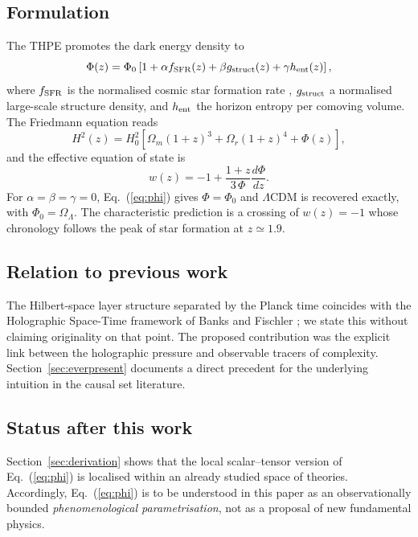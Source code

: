 \documentclass[aps,prd,twocolumn,superscriptaddress,nofootinbib,floatfix]{revtex4-2}
\newcommand{\LCDM}{\ensuremath{\Lambda}CDM}
\begin{document}
\subsection{Formulation}

The THPE promotes the dark energy density to
%
\begin{equation}
\Phi(z)=\Phi_0\left[1+\alpha f_{\rm SFR}(z)+\beta g_{\rm struct}(z)
+\gamma h_{\rm ent}(z)\right],
\label{eq:phi}
\end{equation}
%
where $f_{\rm SFR}$ is the normalised cosmic star formation rate
\cite{Madau2014}, $g_{\rm struct}$ a normalised large-scale structure
density, and $h_{\rm ent}$ the horizon entropy per comoving volume.
The Friedmann equation reads
%
\begin{equation}
H^2(z)=H_0^2\left[\Omega_m(1+z)^3+\Omega_r(1+z)^4+\Phi(z)\right],
\label{eq:friedmann}
\end{equation}
%
and the effective equation of state is
%
\begin{equation}
w(z)=-1+\frac{1+z}{3\,\Phi}\frac{d\Phi}{dz}.
\label{eq:woz}
\end{equation}
%
For $\alpha=\beta=\gamma=0$, Eq.~(\ref{eq:phi}) gives $\Phi=\Phi_0$ and
\LCDM{} is recovered exactly, with $\Phi_0=\Omega_\Lambda$. The
characteristic prediction is a crossing of $w(z)=-1$ whose chronology
follows the peak of star formation at $z\simeq1.9$.

\subsection{Relation to previous work}

The Hilbert-space layer structure separated by the Planck time
coincides with the Holographic Space-Time framework of Banks and
Fischler \cite{Banks2011}; we state this without claiming originality on
that point. The proposed contribution was the explicit link between the
holographic pressure and observable tracers of complexity.
Section~\ref{sec:everpresent} documents a direct precedent for the
underlying intuition in the causal set literature.

\subsection{Status after this work}

Section~\ref{sec:derivation} shows that the local scalar--tensor version
of Eq.~(\ref{eq:phi}) is localised within an already studied space of
theories. Accordingly, Eq.~(\ref{eq:phi}) is to be understood in this
paper as an observationally bounded \emph{phenomenological
parametrisation}, not as a proposal of new fundamental physics.
\end{document}
